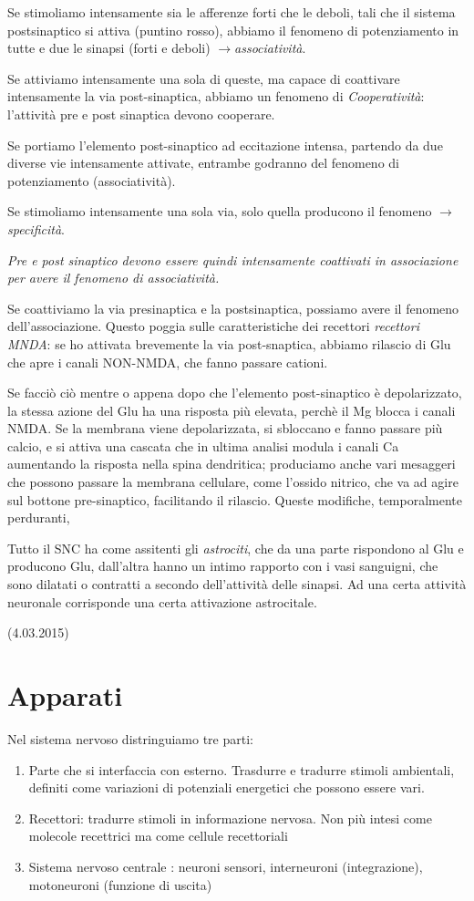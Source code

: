 \documentclass[a4paper,12pt]{article}
\newcommand{\lfreccia}{\ensuremath{\longrightarrow}}
\begin{document}
Se stimoliamo intensamente sia le afferenze forti che le deboli, tali che il sistema postsinaptico si attiva (puntino rosso), abbiamo il fenomeno di potenziamento in tutte e due le sinapsi (forti e deboli) \lfreccia \emph{associatività}.

Se attiviamo intensamente una sola di queste, ma capace di coattivare intensamente la via post-sinaptica, abbiamo un fenomeno di \emph{Cooperatività}: l'attività pre e post sinaptica devono cooperare.

Se portiamo l'elemento post-sinaptico ad eccitazione intensa, partendo da due diverse vie intensamente attivate, entrambe godranno del fenomeno di potenziamento (associatività).

Se stimoliamo intensamente una sola via, solo quella producono il fenomeno \lfreccia \emph{specificità}.

\emph{Pre e post sinaptico devono essere quindi intensamente coattivati in associazione per avere il fenomeno di associatività.}

Se coattiviamo la via presinaptica e la postsinaptica, possiamo avere il fenomeno dell'associazione. Questo poggia sulle caratteristiche dei recettori \emph{recettori MNDA}: se ho attivata brevemente la via post-snaptica, abbiamo rilascio di Glu che apre i canali NON-NMDA, che fanno passare cationi.

Se facciò ciò mentre o appena dopo che l'elemento post-sinaptico è depolarizzato, la stessa azione del Glu ha una risposta più elevata, perchè il Mg blocca i canali NMDA. Se la membrana viene depolarizzata, si sbloccano e fanno passare più calcio, e si attiva una cascata che in ultima analisi modula i canali Ca aumentando la risposta nella spina dendritica; produciamo anche vari mesaggeri che possono passare la membrana cellulare, come l'ossido nitrico, che va ad agire sul bottone pre-sinaptico, facilitando il rilascio. Queste modifiche, temporalmente perduranti, 

Tutto il SNC ha come assitenti gli \emph{astrociti}, che da una parte rispondono al Glu e producono Glu, dall'altra hanno un intimo rapporto con i vasi sanguigni, che sono dilatati o contratti a secondo dell'attività delle sinapsi. Ad una certa attività neuronale corrisponde una certa attivazione astrocitale.

(4.03.2015)
\section{Apparati} 

Nel sistema nervoso distringuiamo tre parti:
\begin{enumerate}
    \item{Parte che si interfaccia con esterno. Trasdurre e tradurre stimoli ambientali, definiti come variazioni di potenziali energetici che possono essere vari. }
    \item{Recettori: tradurre stimoli in informazione nervosa. Non più intesi come molecole recettrici ma come cellule recettoriali}
    \item{Sistema nervoso centrale : neuroni sensori, interneuroni (integrazione), motoneuroni (funzione di uscita)}
\end{enumerate}
\end{document}
